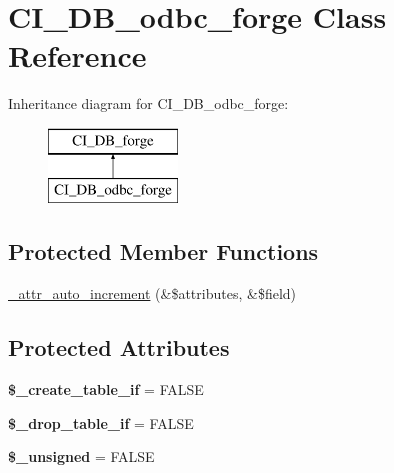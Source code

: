 \hypertarget{class_c_i___d_b__odbc__forge}{}\section{C\+I\+\_\+\+D\+B\+\_\+odbc\+\_\+forge Class Reference}
\label{class_c_i___d_b__odbc__forge}
Inheritance diagram for C\+I\+\_\+\+D\+B\+\_\+odbc\+\_\+forge\+:\begin{figure}[H]
\begin{center}
\leavevmode
\includegraphics[height=2.000000cm]{class_c_i___d_b__odbc__forge}
\end{center}
\end{figure}
\subsection*{Protected Member Functions}
\begin{DoxyCompactItemize}
\item 
\mbox{\hyperlink{class_c_i___d_b__odbc__forge_ac2ae9b5af2bb269d81fed8b295c2e15a}{\+\_\+attr\+\_\+auto\+\_\+increment}} (\&\$attributes, \&\$field)
\end{DoxyCompactItemize}
\subsection*{Protected Attributes}
\begin{DoxyCompactItemize}
\item 
\mbox{\label{class_c_i___d_b__odbc__forge_a4e89b906672cce75e05d4877774d732c}} 
{\bfseries \$\+\_\+create\+\_\+table\+\_\+if} = F\+A\+L\+SE
\item 
\mbox{\label{class_c_i___d_b__odbc__forge_a96e00261b521a94529464475b63cbe20}} 
{\bfseries \$\+\_\+drop\+\_\+table\+\_\+if} = F\+A\+L\+SE
\item 
\mbox{\label{class_c_i___d_b__odbc__forge_a07b1b9ab8111c8611e010ddf601a8737}} 
{\bfseries \$\+\_\+unsigned} = F\+A\+L\+SE
\end{DoxyCompactItemize}
